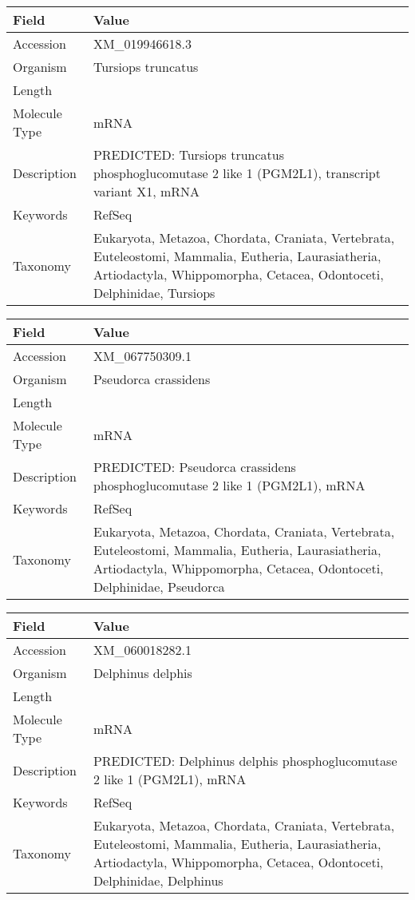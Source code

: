 \documentclass[10pt]{article}
\begin{document}
\vspace{1em}
{\footnotesize
\begin{longtable}{>{\raggedright\arraybackslash}p{4.5cm} >{\raggedright\arraybackslash}p{11.5cm}}
\textbf{Field} & \textbf{Value} \\
\hline
Accession & XM\_019946618.3 \\
Organism & Tursiops truncatus \\
Length & 2841 \\
Molecule Type & mRNA \\
Description & PREDICTED: Tursiops truncatus phosphoglucomutase 2 like 1 (PGM2L1), transcript variant X1, mRNA \\
Keywords & RefSeq \\
Taxonomy & Eukaryota, Metazoa, Chordata, Craniata, Vertebrata, Euteleostomi, Mammalia, Eutheria, Laurasiatheria, Artiodactyla, Whippomorpha, Cetacea, Odontoceti, Delphinidae, Tursiops \\
\end{longtable}
}

\vspace{1em}
{\footnotesize
\begin{longtable}{>{\raggedright\arraybackslash}p{4.5cm} >{\raggedright\arraybackslash}p{11.5cm}}
\textbf{Field} & \textbf{Value} \\
\hline
Accession & XM\_067750309.1 \\
Organism & Pseudorca crassidens \\
Length & 8020 \\
Molecule Type & mRNA \\
Description & PREDICTED: Pseudorca crassidens phosphoglucomutase 2 like 1 (PGM2L1), mRNA \\
Keywords & RefSeq \\
Taxonomy & Eukaryota, Metazoa, Chordata, Craniata, Vertebrata, Euteleostomi, Mammalia, Eutheria, Laurasiatheria, Artiodactyla, Whippomorpha, Cetacea, Odontoceti, Delphinidae, Pseudorca \\
\end{longtable}
}

\vspace{1em}
{\footnotesize
\begin{longtable}{>{\raggedright\arraybackslash}p{4.5cm} >{\raggedright\arraybackslash}p{11.5cm}}
\textbf{Field} & \textbf{Value} \\
\hline
Accession & XM\_060018282.1 \\
Organism & Delphinus delphis \\
Length & 4384 \\
Molecule Type & mRNA \\
Description & PREDICTED: Delphinus delphis phosphoglucomutase 2 like 1 (PGM2L1), mRNA \\
Keywords & RefSeq \\
Taxonomy & Eukaryota, Metazoa, Chordata, Craniata, Vertebrata, Euteleostomi, Mammalia, Eutheria, Laurasiatheria, Artiodactyla, Whippomorpha, Cetacea, Odontoceti, Delphinidae, Delphinus \\
\end{longtable}
}
\end{document}
